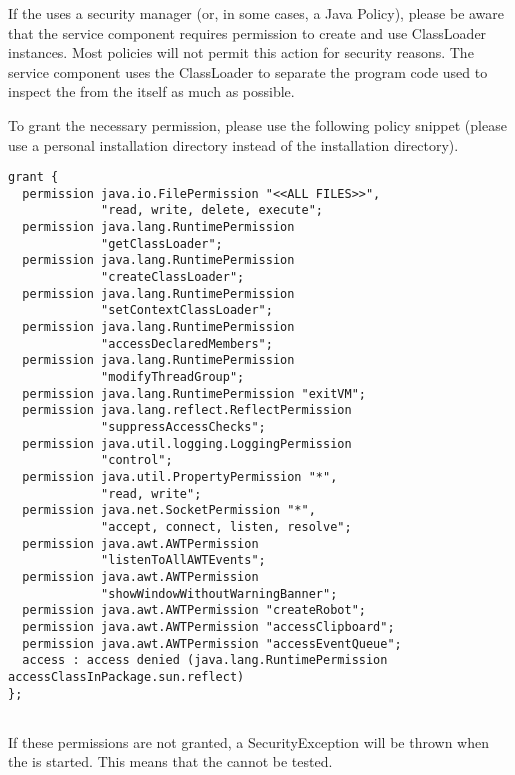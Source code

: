 %

%

If the \gdaut uses a security manager (or, in some cases, a Java Policy), please be aware that the service component requires permission to create and use ClassLoader instances. Most policies will not permit this action for security reasons. The service component uses the ClassLoader to separate the program code used to inspect the \gdaut from the \gdaut itself as much as possible. 

To grant the necessary permission, please use the following policy
snippet (please use a personal installation directory instead of  the
 installation directory).


\footnotesize
\begin{verbatim}
grant {
  permission java.io.FilePermission "<<ALL FILES>>",
             "read, write, delete, execute";
  permission java.lang.RuntimePermission
             "getClassLoader";
  permission java.lang.RuntimePermission
             "createClassLoader";
  permission java.lang.RuntimePermission
             "setContextClassLoader";
  permission java.lang.RuntimePermission
             "accessDeclaredMembers";
  permission java.lang.RuntimePermission
             "modifyThreadGroup";
  permission java.lang.RuntimePermission "exitVM";
  permission java.lang.reflect.ReflectPermission 
             "suppressAccessChecks";
  permission java.util.logging.LoggingPermission
             "control";
  permission java.util.PropertyPermission "*",
             "read, write";
  permission java.net.SocketPermission "*", 
             "accept, connect, listen, resolve";
  permission java.awt.AWTPermission
             "listenToAllAWTEvents";
  permission java.awt.AWTPermission
             "showWindowWithoutWarningBanner";
  permission java.awt.AWTPermission "createRobot";
  permission java.awt.AWTPermission "accessClipboard";
  permission java.awt.AWTPermission "accessEventQueue";
  access : access denied (java.lang.RuntimePermission accessClassInPackage.sun.reflect)
}; 
 
\end{verbatim}
\normalsize

If these permissions are not granted, a SecurityException will be thrown when the \gdaut is started. This means that the \gdaut cannot be tested. 

